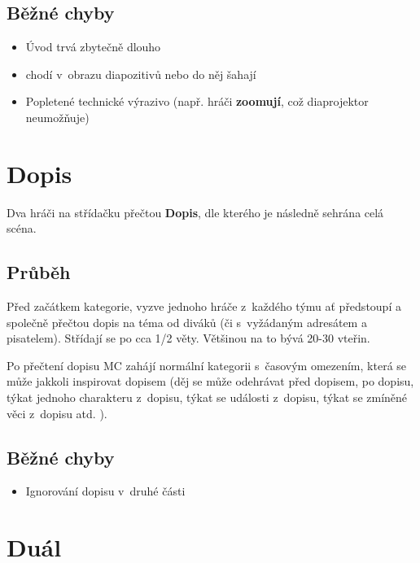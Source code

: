 \subsection{ Běžné chyby } \begin{itemize}
\item Úvod trvá zbytečně dlouho
\item {} chodí v~obrazu diapozitivů nebo do něj šahají
\item Popletené technické výrazivo (např. hráči \textbf{zoomují}, což diaprojektor neumožňuje)
\end{itemize}
 
 
 
 
 
\needspace{5cm} \section{Dopis} \label{dopis}  
Dva hráči na střídačku přečtou \textbf{Dopis}, dle kterého je následně sehrána celá scéna. 
\subsection{Průběh} Před začátkem kategorie, vyzve  jednoho hráče z~každého týmu ať předstoupí a společně přečtou dopis na téma od diváků (či s~vyžádaným adresátem a pisatelem). 
Střídají se po cca 1/2 věty.  Většinou na to bývá 20-30 vteřin.  
 
Po přečtení dopisu MC zahájí normální kategorii s~časovým omezením, která se může jakkoli inspirovat dopisem (děj se může odehrávat před dopisem, po dopisu, týkat jednoho charakteru z~dopisu, týkat se události z~dopisu, týkat se zmíněné věci z~dopisu atd. ). 
\subsection{Běžné chyby} \begin{itemize}
\item Ignorování dopisu v~druhé části
\end{itemize}
 
 
 
 
\needspace{5cm} \section{Duál} \label{duál}  
 
